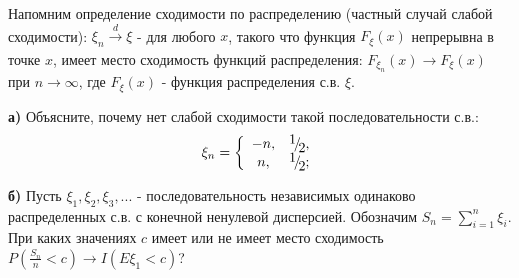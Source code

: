 \begin{problem}
Напомним определение сходимости по распределению (частный случай слабой сходимости): $\xi _{n} \mathop{\to }\limits_{}^{d} \xi $ - для любого $x$, такого что функция $F_{\xi } (x)$ непрерывна в точке $x$, имеет место сходимость функций распределения: $F_{\xi _{n} } (x)\to F_{\xi } (x)$ при $n\to \infty $, где $F_{\xi } (x)$ - функция распределения с.в. $\xi $.

\noindent \textbf{а)} Объясните, почему нет слабой сходимости такой последовательности с.в.:
\[\xi _{n} =\left\{\begin{array}{cc} {-n,} & {{\raise0.7ex\hbox{$ 1 $}\!\mathord{\left/ {\vphantom {1 2}} \right. \kern-\nulldelimiterspace}\!\lower0.7ex\hbox{$ 2 $}} ,} \\ {n,} & {{\raise0.7ex\hbox{$ 1 $}\!\mathord{\left/ {\vphantom {1 2}} \right. \kern-\nulldelimiterspace}\!\lower0.7ex\hbox{$ 2 $}} ;} \end{array}\right. \] 


\begin{comment}
\begin{ordre} 

\noindent $F_{\xi _{n} } (x)=\left\{\begin{array}{cc} {0,} & {x\le -n} \\ {{\raise0.7ex\hbox{$ 1 $}\!\mathord{\left/ {\vphantom {1 2}} \right. \kern-\nulldelimiterspace}\!\lower0.7ex\hbox{$ 2 $}} ,} & {-n<x\le n} \\ {1,} & {x>n} \end{array}\right. $ сходятся к функции $G(x)\equiv \frac{1}{2} $.

\end{ordre} 
\end{comment}

\noindent \textbf{б)} Пусть $\xi _{1} ,\xi _{2} ,\xi _{3} ,...$ - последовательность независимых одинаково распределенных с.в. с конечной ненулевой дисперсией. Обозначим $S_{n} =\sum _{i=1}^{n}\xi _{i}  $. При каких значениях $c$ имеет или не имеет место сходимость $P\left(\frac{S_{n} }{n} <c\right)\to I\left(E\xi _{1} <c\right)$?


\end{problem}


